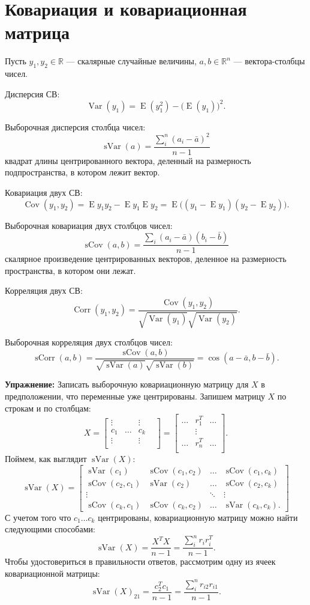 \documentclass[12pt]{article} %
\theoremstyle{definition} %
\DeclareMathOperator{\Cov}{Cov}
\DeclareMathOperator{\sCov}{sCov}
\DeclareMathOperator{\sVar}{sVar}
\DeclareMathOperator{\sCorr}{sCorr}
\DeclareMathOperator{\Corr}{Corr}
\DeclareMathOperator{\Var}{Var}
\DeclareMathOperator{\E}{E}
\def \RR{\mathbb{R}}
\begin{document}
\section{Ковариация и ковариационная матрица}
Пусть \(y_1, y_2 \in \RR\) — скалярные случайные величины,
\(a, b \in \RR^n\) — вектора-столбцы чисел.


Дисперсия СВ:
\[ \Var(y_1) = \E(y_1^2) - \big( \E(y_1) \big)^2. \]

Выборочная дисперсия столбца чисел:
\[ \sVar(a) = \frac{\sum_{i}^n (a_i - \bar{a})^2}{n-1} \]
квадрат длины центрированного вектора, деленный на размерность подпространства, в котором лежит вектор.

Ковариация двух СВ:
\[ \Cov(y_1, y_2) = \E y_1 y_2 - \E y_1 \E y_2= \E \bigg( (y_1 - \E y_1) (y_2 - \E y_2) \bigg).\]

Выборочная ковариация двух столбцов чисел:
\[ \sCov(a, b) = \frac{\sum_i (a_{i} - \bar{a}) (b_{i} - \bar{b})}{n-1}\]
скалярное произведение центрированных векторов, деленное на размерность пространства, в котором они лежат.

Корреляция двух СВ:
\[ \Corr(y_1, y_2) = \frac{\Cov(y_1, y_2)}
{\sqrt{\Var(y_1)} \sqrt{\Var(y_2)} }. \]

Выборочная корреляция двух столбцов чисел:
\[ \sCorr(a, b) = \frac{\sCov(a, b)}
{\sqrt{\sVar(a)} \sqrt{\sVar(b)} } =
\cos (a - \bar{a}, b - \bar{b}). \]

\textbf{Упражнение:}
Записать выборочную ковариационную матрицу для \(X\) в предположении, что переменные уже центрированы. Запишем матрицу \(X\) по строкам и по столбцам:
\[
X = \begin{bmatrix}
    \vdots &  & \vdots & \\
    c_1 & \dots & c_k \\
    \vdots &  & \vdots & \\
    \end{bmatrix}
    =
    \begin{bmatrix}
    \dots & r_{1}^T & \dots \\
    & \vdots & \\
    \dots & r_{n}^T & \dots \\
    \end{bmatrix}.
\]
Поймем, как выглядит \( \sVar(X) \):
\[
\sVar(X) = \begin{bmatrix}
\sVar(c_1) & \sCov(c_1, c_2) & \dots & \sCov(c_1, c_k) \\
\sCov(c_2, c_1) & \sVar(c_2) & \dots & \sCov(c_2, c_k) \\
\vdots & & \ddots & \vdots\\
\sCov(c_k, c_1) & \sCov(c_k, c_2) & \dots & \sVar(c_k, c_k).
\end{bmatrix}
\]
С учетом того что \( c_1 \dots c_k \) центрированы, ковариационную матрицу можно найти следующими способами:
\[ \sVar(X) = \frac{X^TX}{n-1} = \frac{\sum_i^n r_i r_i^T}{n-1}.\]
Чтобы удостовериться в правильности ответов, рассмотрим одну из ячеек ковариационной матрицы:
\[\sVar(X)_{21} = \frac{c_2^Tc_1}{n-1} = \frac{\sum_i^n r_{i2} r_{i1} }{n-1}. \]
\end{document}
